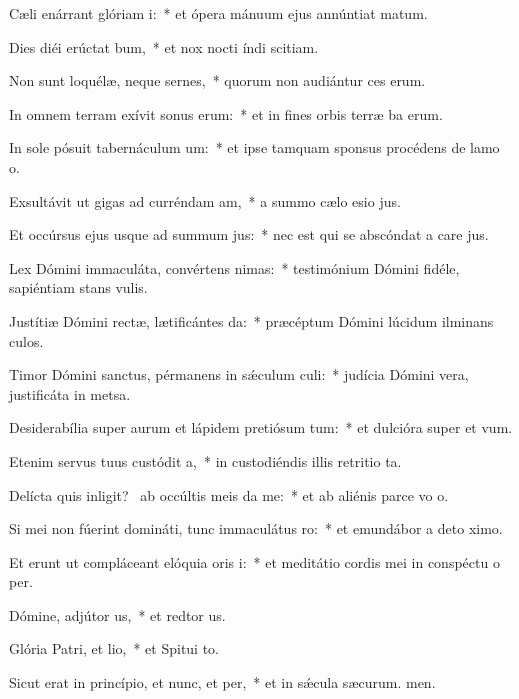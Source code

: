 \item Cæli enárrant glóriam i:~* et ópera mánuum ejus annúntiat matum.
\item Dies diéi erúctat bum,~* et nox nocti índi scitiam.
\item Non sunt loquélæ, neque sernes,~* quorum non audiántur ces erum.
\item In omnem terram exívit sonus erum:~* et in fines orbis terræ ba erum.
\item In sole pósuit tabernáculum um:~* et ipse tamquam sponsus procédens de lamo o.
\item Exsultávit ut gigas ad curréndam am,~* a summo cælo esio jus.
\item Et occúrsus ejus usque ad summum jus:~* nec est qui se abscóndat a care jus.
\item Lex Dómini immaculáta, convértens nimas:~* testimónium Dómini fidéle, sapiéntiam stans vulis.
\item Justítiæ Dómini rectæ, lætificántes da:~* præcéptum Dómini lúcidum ilminans culos.
\item Timor Dómini sanctus, pérmanens in sǽculum culi:~* judícia Dómini vera, justificáta in metsa.
\item Desiderabília super aurum et lápidem pretiósum tum:~* et dulcióra super  et vum.
\item Etenim servus tuus custódit a,~* in custodiéndis illis retritio ta.
\item Delícta quis inligit?~\pscross{} ab occúltis meis da me:~* et ab aliénis parce vo o.
\item Si mei non fúerint domináti, tunc immaculátus ro:~* et emundábor a deto ximo.
\item Et erunt ut compláceant elóquia oris i:~* et meditátio cordis mei in conspéctu o per.
\item Dómine, adjútor us,~* et redtor us.
\item Glória Patri, et lio,~* et Spitui to.
\item Sicut erat in princípio, et nunc, et per,~* et in sǽcula sæcurum. men.
